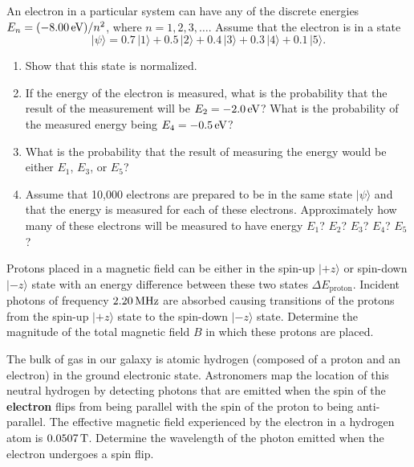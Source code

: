 \begin{problem}
An electron in a particular system can have any of the discrete
  energies $E_n = (-8.00\,\mbox{eV})/n^2$, where $n = 1, 2, 3, \dots$. Assume
  that the electron is in a state 
  \[ |\psi\rangle = 0.7\,|1\rangle + 0.5\,|2\rangle + 0.4\,|3\rangle 
        + 0.3\,|4\rangle + 0.1\,|5\rangle.  \]
  \begin{enumerate}
  \item Show that this state is normalized.
  \item If the energy of the electron is measured, what is the probability that the result of the measurement will be $E_2 = -2.0\,\mbox{eV}$? What is the probability of the measured energy being $E_4 = -0.5\,\mbox{eV}$?
  \item What is the probability that the result of measuring the energy would be either $E_1$, $E_3$, or $E_5$?
  
  \item Assume that 10,000 electrons are prepared to be in the same
    state $|\psi\rangle$ and that the energy is measured for each of these electrons.  Approximately how many of these electrons will be measured to have energy $E_1$?  $E_2$?  $E_3$?  $E_4$?  $E_5$?
  
  \end{enumerate}
\label{prob:atomic_energies}
\end{problem}

\begin{problem}
Protons placed in a magnetic field can be either in the spin-up
$\vert\mbox{$+z$}\rangle$ or spin-down $\vert\mbox{$-z$}\rangle$ state
with an energy difference between these two states $\Delta E_\text{proton}$.  
Incident photons of frequency $2.20 \,\mbox{MHz}$ are absorbed 
causing transitions
of the protons from the spin-up $\vert\mbox{$+z$}\rangle$ state to the
spin-down $\vert\mbox{$-z$}\rangle$ state.  Determine the magnitude of
the total magnetic field $B$ in which these protons are placed.
\end{problem}


\begin{problem}
The bulk of gas in our galaxy is atomic hydrogen (composed of a proton and an electron) in the ground electronic state.  Astronomers map the location of this neutral hydrogen by detecting photons that are emitted when the spin of the {\bf electron} flips from being parallel with the spin of the proton to being anti-parallel.  The effective magnetic field experienced by the electron in a hydrogen atom is $0.0507 \,\mbox{T}$.  Determine the wavelength of the photon emitted when the electron undergoes a spin flip.
\label{prob:H_hyperfine}
\end{problem}

